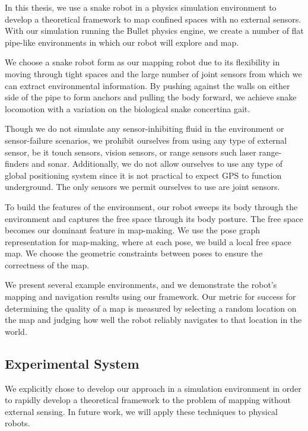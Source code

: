 In this thesis, we use a snake robot in a physics simulation environment to develop a theoretical framework to map confined spaces with no external sensors.  With our simulation running the Bullet physics engine, we create a number of flat pipe-like environments in which our robot will explore and map.

We choose a snake robot form as our mapping robot due to its flexibility in moving through tight spaces and the large number of joint sensors from which we can extract environmental information. By pushing against the walls on either side of the pipe to form anchors and pulling the body forward, we achieve snake locomotion with a variation on the biological snake concertina gait.

Though we do not simulate any sensor-inhibiting fluid in the environment or sensor-failure scenarios, we prohibit ourselves from using any type of external sensor, be it touch sensors, vision sensors, or range sensors such laser range-finders and sonar.  Additionally, we do not allow ourselves to use any type of global positioning system since it is not practical to expect GPS to function underground.  The only sensors we permit ourselves to use are joint sensors.

To build the features of the environment, our robot sweeps its body through the environment and captures the free space through its body posture.   The free space becomes our dominant feature in map-making.   We use the pose graph representation for map-making, where at each pose, we build a local free space map.  We choose the geometric constraints between poses to ensure the correctness of the map.

We present several example environments, and we demonstrate the robot’s mapping and navigation results using our framework.   Our metric for success for determining the quality of a map is measured by selecting a random location on the map and judging how well the robot reliably navigates to that location in the world.

\subsection{Experimental System}

We explicitly chose to develop our approach in a simulation environment in order to rapidly develop a theoretical framework to the problem of mapping without external sensing.  In future work, we will apply these techniques to physical robots.

